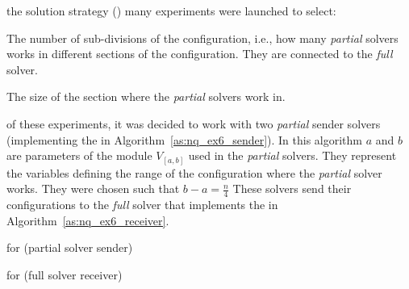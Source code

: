  the solution strategy (\as) many experiments were launched to select: \begin{inparaenum} \item The number of sub-divisions of the configuration, i.e., how many {\it partial} solvers works in different sections of the configuration. They are connected to the {\it full} solver. \item The size of the section where the {\it partial} solvers work in. \end{inparaenum} 

 of these experiments, it was decided to work with two {\it partial} sender solvers (implementing the \as{} in Algorithm~\ref{as:nq_ex6_sender}). In this algorithm $a$ and $b$ are parameters of the module $V_{[a,b]}$ used in the {\it partial} solvers. They represent the variables defining the range of the configuration where the {\it partial} solver works. They were chosen such that $b-a = \tfrac{n}{4}$ These solvers send their configurations to the {\it full} solver that implements the \as{} in Algorithm~\ref{as:nq_ex6_receiver}.

\begin{algorithm}[H]
\dontprintsemicolon
\SetNoline
{}
\caption{\As{} for \NQP{} (partial solver sender)}\label{as:nq_ex6_sender}
\end{algorithm}

\begin{algorithm}[H]
\dontprintsemicolon
\SetNoline
{}
\caption{\As{} for \NQP{} (full solver receiver)}\label{as:nq_ex6_receiver}
\end{algorithm}

